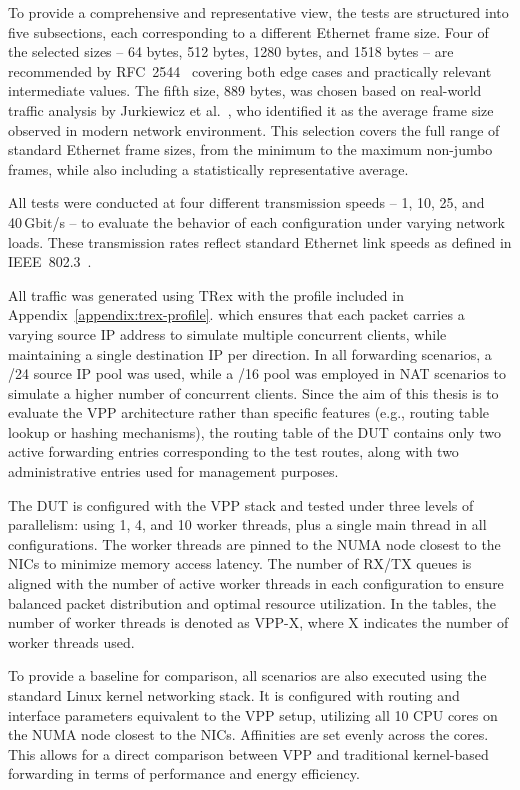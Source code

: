To provide a comprehensive and representative view, the tests are structured into five subsections, each corresponding to a different Ethernet frame size. 
Four of the selected sizes -- 64 bytes, 512 bytes, 1280 bytes, and 1518 bytes -- are recommended by RFC~2544~\cite{rfc2544} 
covering both edge cases and practically relevant intermediate values. 
The fifth size, 889 bytes, was chosen based on real-world traffic analysis by Jurkiewicz et al.~\cite{JURKIEWICZ202115}, who identified it as the average frame size observed in modern network environment.
This selection covers the full range of standard Ethernet frame sizes, from the minimum to the maximum non-jumbo frames, 
while also including a statistically representative average.

All tests were conducted at four different transmission speeds -- 1, 10, 25, and 40 Gbit/s -- to evaluate the behavior of each configuration under varying network loads.  
These transmission rates reflect standard Ethernet link speeds as defined in IEEE~802.3~\cite{802.3}.

All traffic was generated using TRex with the profile included in Appendix~\ref{appendix:trex-profile}.
which ensures that each packet carries a varying source IP address to simulate multiple concurrent clients, while maintaining a single destination IP per direction.
In all forwarding scenarios, a /24 source IP pool was used, while a /16 pool was employed in NAT scenarios to simulate a higher number of concurrent clients.
Since the aim of this thesis is to evaluate the VPP architecture rather than specific features (e.g., routing table lookup or hashing mechanisms),
the routing table of the DUT contains only two active forwarding entries corresponding to the test routes,
along with two administrative entries used for management purposes.

The DUT is configured with the VPP stack and tested under three levels of parallelism: using 1, 4, and 10 worker threads, plus a single main thread in all configurations.
The worker threads are pinned to the NUMA node closest to the NICs to minimize memory access latency.
The number of RX/TX queues is aligned with the number of active worker threads in each configuration to ensure balanced packet distribution and optimal resource utilization.
In the tables, the number of worker threads is denoted as VPP-X, where X indicates the number of worker threads used.

To provide a baseline for comparison, all scenarios are also executed using the standard Linux kernel networking stack.
It is configured with routing and interface parameters equivalent to the VPP setup, utilizing all 10 CPU cores on the NUMA node closest to the NICs.
Affinities are set evenly across the cores.
This allows for a direct comparison between VPP and traditional kernel-based forwarding in terms of performance and energy efficiency.

